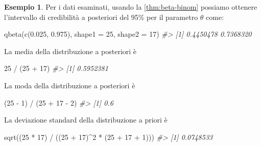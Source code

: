 \documentclass[
  11pt,
  italian,
  a4paper,
  extrafontsizes,onecolumn,openright
  ]{memoir}
\newenvironment{Shaded}{\begin{snugshade}}{\end{snugshade}}
\newcommand{\AttributeTok}[1]{\textcolor[rgb]{0.77,0.63,0.00}{#1}}
\newcommand{\CommentTok}[1]{\textcolor[rgb]{0.56,0.35,0.01}{\textit{#1}}}
\newcommand{\DecValTok}[1]{\textcolor[rgb]{0.00,0.00,0.81}{#1}}
\newcommand{\FloatTok}[1]{\textcolor[rgb]{0.00,0.00,0.81}{#1}}
\newcommand{\FunctionTok}[1]{\textcolor[rgb]{0.00,0.00,0.00}{#1}}
\newcommand{\NormalTok}[1]{#1}
\newcommand{\SpecialCharTok}[1]{\textcolor[rgb]{0.00,0.00,0.00}{#1}}
\theoremstyle{definition}
\theoremstyle{definition}
\newtheorem{example}{Esempio}[chapter]
\theoremstyle{definition}
\theoremstyle{definition}
\theoremstyle{remark}
\begin{document}
\begin{example}

Per i dati esaminati, usando la \ref{thm:beta-binom} possiamo ottenere l'intervallo di credibilità a posteriori del 95\% per il parametro \(\theta\) come:

\begin{Shaded}
\begin{Highlighting}[]
\FunctionTok{qbeta}\NormalTok{(}\FunctionTok{c}\NormalTok{(}\FloatTok{0.025}\NormalTok{, }\FloatTok{0.975}\NormalTok{), }\AttributeTok{shape1 =} \DecValTok{25}\NormalTok{, }\AttributeTok{shape2 =} \DecValTok{17}\NormalTok{)}
\CommentTok{\#\textgreater{} [1] 0.4450478 0.7368320}
\end{Highlighting}
\end{Shaded}

\noindent
La media della distribuzione a posteriori è

\begin{Shaded}
\begin{Highlighting}[]
\DecValTok{25} \SpecialCharTok{/}\NormalTok{ (}\DecValTok{25} \SpecialCharTok{+} \DecValTok{17}\NormalTok{)}
\CommentTok{\#\textgreater{} [1] 0.5952381}
\end{Highlighting}
\end{Shaded}

\noindent
La moda della distribuzione a posteriori è

\begin{Shaded}
\begin{Highlighting}[]
\NormalTok{(}\DecValTok{25} \SpecialCharTok{{-}} \DecValTok{1}\NormalTok{) }\SpecialCharTok{/}\NormalTok{ (}\DecValTok{25} \SpecialCharTok{+} \DecValTok{17} \SpecialCharTok{{-}} \DecValTok{2}\NormalTok{)}
\CommentTok{\#\textgreater{} [1] 0.6}
\end{Highlighting}
\end{Shaded}

\noindent
La deviazione standard della distribuzione a priori è

\begin{Shaded}
\begin{Highlighting}[]
\FunctionTok{sqrt}\NormalTok{((}\DecValTok{25} \SpecialCharTok{*} \DecValTok{17}\NormalTok{) }\SpecialCharTok{/}\NormalTok{ ((}\DecValTok{25} \SpecialCharTok{+} \DecValTok{17}\NormalTok{)}\SpecialCharTok{\^{}}\DecValTok{2} \SpecialCharTok{*}\NormalTok{ (}\DecValTok{25} \SpecialCharTok{+} \DecValTok{17} \SpecialCharTok{+} \DecValTok{1}\NormalTok{)))}
\CommentTok{\#\textgreater{} [1] 0.0748533}
\end{Highlighting}
\end{Shaded}

\end{example}
\end{document}
